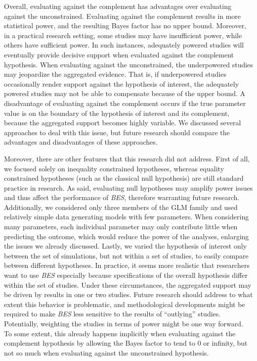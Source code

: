 \documentclass[
]{interact}
\begin{document}
Overall, evaluating against the complement has advantages over
evaluating against the unconstrained. Evaluating against the complement
results in more statistical power, and the resulting Bayes factor has no
upper bound. Moreover, in a practical research setting, some studies may
have insufficient power, while others have sufficient power. In such
instances, adequately powered studies will eventually provide decisive
support when evaluated against the complement hypothesis. When
evaluating against the unconstrained, the underpowered studies may
jeopardize the aggregated evidence. That is, if underpowered studies
occasionally render support against the hypothesis of interest, the
adequately powered studies may not be able to compensate because of the
upper bound. A disadvantage of evaluating against the complement occurs
if the true parameter value is on the boundary of the hypothesis of
interest and its complement, because the aggregated support becomes
highly variable. We discussed several approaches to deal with this
issue, but future research should compare the advantages and
disadvantages of these approaches.

Moreover, there are other features that this research did not address.
First of all, we focused solely on inequality constrained hypotheses,
whereas equality constrained hypotheses (such as the classical null
hypothesis) are still standard practice in research. As said, evaluating
null hypotheses may amplify power issues and thus affect the performance
of \emph{BES}, therefore warranting future research. Additionally, we
considered only three members of the GLM family and used relatively
simple data generating models with few parameters. When considering many
parameters, each individual parameter may only contribute little when
predicting the outcome, which would reduce the power of the analyses,
enlarging the issues we already discussed. Lastly, we varied the
hypothesis of interest only between the set of simulations, but not
within a set of studies, to easily compare between different hypotheses.
In practice, it seems more realistic that researchers want to use
\emph{BES} especially because specifications of the overall hypothesis
differ within the set of studies. Under these circumstances, the
aggregated support may be driven by results in one or two studies.
Future research should address to what extent this behavior is
problematic, and methodological developments might be required to make
\emph{BES} less sensitive to the results of ``outlying'' studies.
Potentially, weighting the studies in terms of power might be one way
forward. To some extent, this already happens implicitly when evaluating
against the complement hypothesis by allowing the Bayes factor to tend
to 0 or infinity, but not so much when evaluating against the
unconstrained hypothesis.
\end{document}
